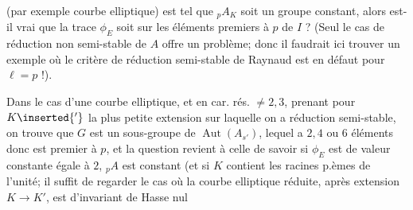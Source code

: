 (par exemple courbe elliptique) est tel que ${}_pA_K$ soit un groupe constant, alors est-il vrai que la trace $\phi_E$ soit  sur les  éléments premiers à $p$ de $I$ ? (Seul le cas de réduction non semi-stable de $A$ offre un problème; donc il faudrait ici trouver un exemple où le critère de réduction semi-stable de Raynaud est en défaut pour $\ell=p$ !).

Dans le cas d'une courbe elliptique, et en car. rés. $\ne 2,3$, prenant pour $K\inserted{'}$ la plus petite extension sur laquelle on a réduction semi-stable, on trouve que $G$ est un sous-groupe de $\operatorname{Aut}(A_{s'})$, lequel  a $2,4$ ou $6$ éléments donc est premier à $p$, et la question revient à celle de savoir si $\phi_E$ est de valeur constante égale à $2$,  ${}_pA$ est constant\deleted{\unsure{,}} (et si $K$ contient les racines p.èmes de l'unité; il suffit de regarder le cas où la courbe elliptique réduite, après extension $K\longrightarrow K'$, est d'invariant de Hasse nul\inserted{)}
